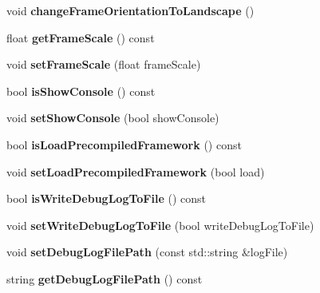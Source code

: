 \begin{DoxyCompactItemize}
void {\bfseries change\+Frame\+Orientation\+To\+Landscape} ()
\item 
\mbox{\label{classProjectConfig_aa8b015a1725a29888a31b73edea79960}} 
float {\bfseries get\+Frame\+Scale} () const
\item 
\mbox{\label{classProjectConfig_aa3058024e2fb5a7c8792b3091ee67f2e}} 
void {\bfseries set\+Frame\+Scale} (float frame\+Scale)
\item 
\mbox{\label{classProjectConfig_ad75bea6af1c1314db4c2d536c1f7079a}} 
bool {\bfseries is\+Show\+Console} () const
\item 
\mbox{\label{classProjectConfig_a6350edad040596c3241b46108c18f8c2}} 
void {\bfseries set\+Show\+Console} (bool show\+Console)
\item 
\mbox{\label{classProjectConfig_aa5f71bdcd23d53cfcedb9fbf4a29c9e7}} 
bool {\bfseries is\+Load\+Precompiled\+Framework} () const
\item 
\mbox{\label{classProjectConfig_ab37e2bcc6ef5f4a65b25ca569451aace}} 
void {\bfseries set\+Load\+Precompiled\+Framework} (bool load)
\item 
\mbox{\label{classProjectConfig_ad4bae4d4bcba757d163e901759257004}} 
bool {\bfseries is\+Write\+Debug\+Log\+To\+File} () const
\item 
\mbox{\label{classProjectConfig_a20ba6f9e1e03dcb94d79c7f9f2632e13}} 
void {\bfseries set\+Write\+Debug\+Log\+To\+File} (bool write\+Debug\+Log\+To\+File)
\item 
\mbox{\label{classProjectConfig_a55043d51d69792dd7eef516587b48a49}} 
void {\bfseries set\+Debug\+Log\+File\+Path} (const std\+::string \&log\+File)
\item 
\mbox{\label{classProjectConfig_ac03f6d58914e3053d9faebfc8f186d7e}} 
string {\bfseries get\+Debug\+Log\+File\+Path} () const
\item 
\mbox{\label{classProjectConfig_ac03bcb40b650a827bb36147108c14419}} 

\end{DoxyCompactItemize}
